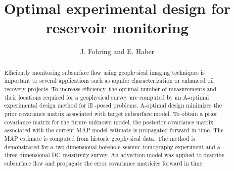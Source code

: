 \documentclass[12pt]{article}
\begin{document}
\title{Optimal experimental design for reservoir monitoring}
\author{J. Fohring and E. Haber }


\maketitle
\begin{abstract}
Efficiently monitoring subsurface flow using geophysical imaging techniques is important to several applications such as aquifer characterization or enhanced oil recovery projects.
To increase efficiency, the optimal number of measurements and their locations required for a geophysical survey are computed by an A-optimal experimental design method for ill -posed problems. 
A-optimal design minimizes the prior covariance matrix associated with target subsurface model. To obtain a prior covariance matrix for the future unknown model, the posterior covariance matrix associated with the current MAP model estimate is propagated forward in time. The MAP estimate is computed from historic geophysical data. The method is demonstrated for a two dimensional borehole seismic tomography experiment and a three dimensional DC resisitivity survey. An advection model  was applied to describe subsurface flow and  propagate the error covariance matricies forward in time. 
 


\end{abstract}
\end{document}
